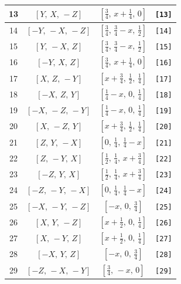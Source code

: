\documentclass[fleqn,8pt]{jsarticle}
\begin{document}
\begin{longtable}{cccc}
13 & $\left[ Y,\, X,\, - Z \right]$ & $\left[ \frac{3}{4},\, x + \frac{1}{4},\, 0 \right]$ & {\tt [13]} \\ \hline
14 & $\left[ - Y,\, - X,\, - Z \right]$ & $\left[ \frac{3}{4},\, \frac{3}{4} - x,\, \frac{1}{2} \right]$ & {\tt [14]} \\ \hline
15 & $\left[ Y,\, - X,\, Z \right]$ & $\left[ \frac{3}{4},\, \frac{3}{4} - x,\, \frac{1}{2} \right]$ & {\tt [15]} \\ \hline
16 & $\left[ - Y,\, X,\, Z \right]$ & $\left[ \frac{3}{4},\, x + \frac{1}{4},\, 0 \right]$ & {\tt [16]} \\ \hline
17 & $\left[ X,\, Z,\, - Y \right]$ & $\left[ x + \frac{3}{4},\, \frac{1}{2},\, \frac{1}{4} \right]$ & {\tt [17]} \\ \hline
18 & $\left[ - X,\, Z,\, Y \right]$ & $\left[ \frac{1}{4} - x,\, 0,\, \frac{1}{4} \right]$ & {\tt [18]} \\ \hline
19 & $\left[ - X,\, - Z,\, - Y \right]$ & $\left[ \frac{1}{4} - x,\, 0,\, \frac{1}{4} \right]$ & {\tt [19]} \\ \hline
20 & $\left[ X,\, - Z,\, Y \right]$ & $\left[ x + \frac{3}{4},\, \frac{1}{2},\, \frac{1}{4} \right]$ & {\tt [20]} \\ \hline
21 & $\left[ Z,\, Y,\, - X \right]$ & $\left[ 0,\, \frac{1}{4},\, \frac{1}{4} - x \right]$ & {\tt [21]} \\ \hline
22 & $\left[ Z,\, - Y,\, X \right]$ & $\left[ \frac{1}{2},\, \frac{1}{4},\, x + \frac{3}{4} \right]$ & {\tt [22]} \\ \hline
23 & $\left[ - Z,\, Y,\, X \right]$ & $\left[ \frac{1}{2},\, \frac{1}{4},\, x + \frac{3}{4} \right]$ & {\tt [23]} \\ \hline
24 & $\left[ - Z,\, - Y,\, - X \right]$ & $\left[ 0,\, \frac{1}{4},\, \frac{1}{4} - x \right]$ & {\tt [24]} \\ \hline
25 & $\left[ - X,\, - Y,\, - Z \right]$ & $\left[ - x,\, 0,\, \frac{3}{4} \right]$ & {\tt [25]} \\ \hline
26 & $\left[ X,\, Y,\, - Z \right]$ & $\left[ x + \frac{1}{2},\, 0,\, \frac{1}{4} \right]$ & {\tt [26]} \\ \hline
27 & $\left[ X,\, - Y,\, Z \right]$ & $\left[ x + \frac{1}{2},\, 0,\, \frac{1}{4} \right]$ & {\tt [27]} \\ \hline
28 & $\left[ - X,\, Y,\, Z \right]$ & $\left[ - x,\, 0,\, \frac{3}{4} \right]$ & {\tt [28]} \\ \hline
29 & $\left[ - Z,\, - X,\, - Y \right]$ & $\left[ \frac{3}{4},\, - x,\, 0 \right]$ & {\tt [29]} \\ \hline

\end{longtable}
\end{document}
